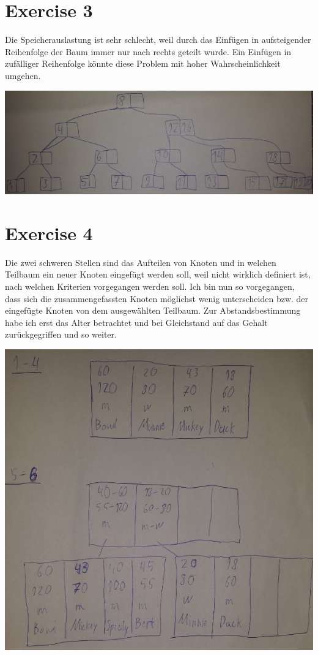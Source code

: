 \documentclass[10pt,a4paper]{article}
\begin{document}
\section*{Exercise 3}

Die Speicherauslastung ist sehr schlecht, weil durch das Einfügen in aufsteigender Reihenfolge der Baum immer nur nach rechts geteilt wurde.
Ein Einfügen in zufälliger Reihenfolge könnte diese Problem mit hoher Wahrscheinlichkeit umgehen.

\includegraphics[width=\textwidth]{sheet-11/exercise-3}

\section*{Exercise 4}

Die zwei schweren Stellen sind das Aufteilen von Knoten und in welchen Teilbaum ein neuer Knoten eingefügt werden soll, weil nicht wirklich definiert ist, nach welchen Kriterien vorgegangen werden soll.
Ich bin nun so vorgegangen, dass sich die zusammengefassten Knoten möglichst wenig unterscheiden bzw. der eingefügte Knoten von dem ausgewählten Teilbaum.
Zur Abstandsbestimmung habe ich erst das Alter betrachtet und bei Gleichstand auf das Gehalt zurückgegriffen und so weiter.

\includegraphics[width=\textwidth]{sheet-11/exercise-4}
\end{document}
